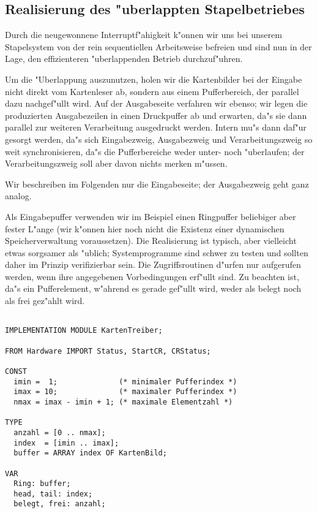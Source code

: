\subsection {Realisierung des "uberlappten Stapelbetriebes}

Durch die neugewonnene Interruptf"ahigkeit 
k"onnen wir uns bei unserem Stapelsystem 
von der rein sequentiellen Arbeitsweise befreien 
und sind nun in der Lage, 
den effizienteren "uberlappenden Betrieb durchzuf"uhren.


Um die "Uberlappung auszunutzen, 
holen wir die Kartenbilder bei der Eingabe 
nicht direkt vom Kartenleser ab, 
sondern aus einem Pufferbereich,
der parallel dazu nachgef"ullt wird. 
Auf der Ausgabeseite verfahren wir ebenso;
wir legen die produzierten Ausgabezeilen 
in einen Druckpuffer ab und erwarten, 
da"s sie dann parallel zur weiteren Verarbeitung
ausgedruckt werden. 
Intern mu"s dann daf"ur gesorgt werden, da"s sich
Eingabezweig, Ausgabezweig und Verarbeitungszweig
so weit synchronisieren,
da"s die Pufferbereiche weder unter- noch "uberlaufen;
der Verarbeitungszweig soll aber davon nichts merken m"ussen.

Wir beschreiben im Folgenden nur die Eingabeseite;
der Ausgabezweig geht ganz analog.

Als Eingabepuffer verwenden wir im Beispiel einen Ringpuffer
beliebiger aber fester L"ange (wir k"onnen hier noch nicht
die Existenz einer dynamischen Speicherverwaltung voraussetzen).
Die Realisierung ist typisch, 
aber vielleicht etwas sorgsamer als "ublich;
Systemprogramme sind schwer zu testen und 
sollten daher im Prinzip verifizierbar sein.
Die Zugriffsroutinen d"urfen nur aufgerufen werden,
wenn ihre angegebenen Vorbedingungen erf"ullt sind.
Zu beachten ist, da"s ein Pufferelement,
w"ahrend es gerade gef"ullt wird,
weder als belegt noch als frei gez"ahlt wird.

\begin{verbatim}

IMPLEMENTATION MODULE KartenTreiber;

FROM Hardware IMPORT Status, StartCR, CRStatus;

CONST 
  imin =  1;              (* minimaler Pufferindex *)
  imax = 10;              (* maximaler Pufferindex *)
  nmax = imax - imin + 1; (* maximale Elementzahl *)

TYPE
  anzahl = [0 .. nmax];
  index  = [imin .. imax];
  buffer = ARRAY index OF KartenBild;

VAR
  Ring: buffer;
  head, tail: index;
  belegt, frei: anzahl;

\end{verbatim}


